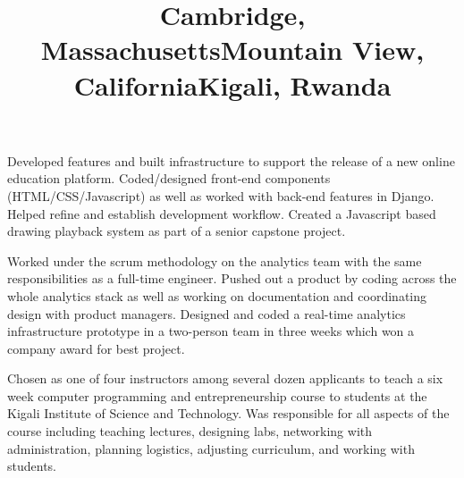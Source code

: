 \begin{resume}
\title{Cambridge, Massachusetts}
\begin{position}
Developed features and built infrastructure to support the release of a new online education platform. Coded/designed front-end components (HTML/CSS/Javascript) as well as worked with back-end features in Django. Helped refine and establish development workflow. Created a Javascript based drawing playback system as part of a senior capstone project.
\end{position}

\title{Mountain View, California}
\begin{position}
Worked under the scrum methodology on the analytics team with the same responsibilities as a full-time engineer. Pushed out a product by coding across the whole analytics stack as well as working on documentation and coordinating design with product managers. Designed and coded a real-time analytics infrastructure prototype in a two-person team in three weeks which won a company award for best project.
\end{position}

\title{Kigali, Rwanda}
\begin{position}
Chosen as one of four instructors among several dozen applicants to teach a six week computer programming and entrepreneurship course to students at the Kigali Institute of Science and Technology. Was responsible for all aspects of the course including teaching lectures, designing labs, networking with administration, planning logistics, adjusting curriculum, and working with students.\end{position}

%   



\end{resume}
